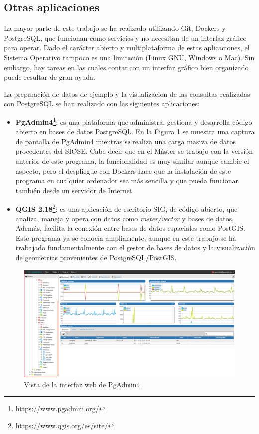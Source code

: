 \subsection{Otras aplicaciones}\label{subsec:aplic}

La mayor parte de este trabajo se ha realizado utilizando Git, Dockers y PostgreSQL, que funcionan como servicios y no necesitan de un interfaz gráfico para operar. Dado el carácter abierto y multiplataforma de estas aplicaciones, el Sistema Operativo tampoco es una limitación (Linux GNU, Windows o Mac). Sin embargo, hay tareas en las cuales contar con un interfaz gráfico bien organizado puede resultar de gran ayuda.

La preparación de datos de ejemplo y la visualización de las consultas realizadas con PostgreSQL se han realizado con las siguientes aplicaciones:

\begin{itemize}
\item\textbf{PgAdmin4}\footnote{\url{https://www.pgadmin.org/}}: es una plataforma que administra, gestiona y desarrolla código abierto en bases de datos PostgreSQL. En la Figura \ref{fig:carga} se muestra una captura de pantalla de PgAdmin4 mientras se realiza una carga masiva de datos procedentes del SIOSE. Cabe decir que en el Máster se trabajo con la versión anterior de este programa, la funcionalidad es muy similar aunque cambie el aspecto, pero el despliegue con Dockers hace que la instalación de este programa en cualquier ordenador sea más sencilla y que pueda funcionar también desde un servidor de Internet.
\item\textbf{QGIS 2.18}\footnote{\url{https://www.qgis.org/es/site/}}: es una aplicación de escritorio SIG, de código abierto, que analiza, maneja y opera con datos como \textit{raster/vector} y bases de datos. Además, facilita la conexión entre bases de datos espaciales como PostGIS. Este programa ya se conocía ampliamente, aunque en este trabajo se ha trabajado fundamentalmente con el gestor de bases de datos y la visualización de geometrías provenientes de PostgreSQL/PostGIS.
\end{itemize}

\begin{figure}
\begin{center}
\includegraphics[width=\textwidth]{Metodologia/Figs/carga-siose-2011.png}
\caption{Vista de la interfaz web de PgAdmin4. \label{fig:carga}}
\end{center}
\end{figure}


